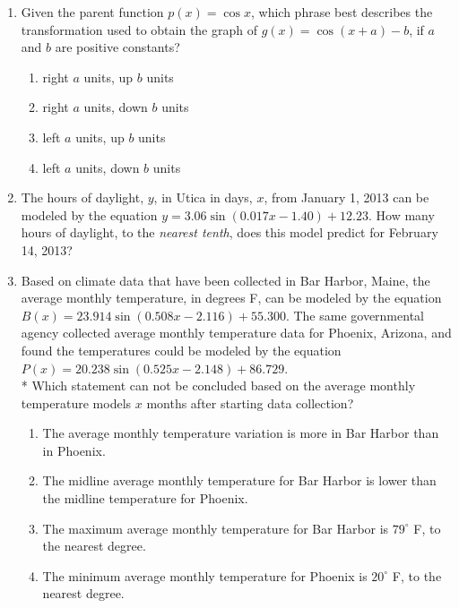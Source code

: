 \documentclass[12pt, oneside]{article}
\begin{document}
\begin{enumerate}
\item Given the parent function $p(x)=\cos x$, which phrase best describes the transformation used to obtain the graph of $g(x)=  \cos (x+a) - b$, if $a$ and $b$ are positive constants?
\begin{enumerate}
    \item right $a$ units, up $b$ units
    \item right $a$ units, down $b$ units
    \item left $a$ units, up $b$ units
    \item left $a$ units, down $b$ units
\end{enumerate}%

\item The hours of daylight, $y$, in Utica in days, $x$, from January 1, 2013 can be modeled by the equation $y = 3.06 \sin(0.017x-1.40) +12.23$. How many hours of daylight, to the \emph{nearest tenth}, does this model predict for February 14, 2013?

\item Based on climate data that have been collected in Bar Harbor, Maine, the average monthly temperature, in degrees F, can be modeled by the equation $B(x)=23.914 \sin(0.508x-2.116)+55.300$. The same governmental agency collected average monthly temperature data for Phoenix, Arizona, and found the temperatures could be modeled by the equation $P(x)=20.238 \sin(0.525x-2.148)+86.729$.\\*
Which statement can not be concluded based on the average monthly temperature models $x$ months after starting data collection?
\begin{enumerate}
    \item The average monthly temperature variation is more in Bar Harbor than in Phoenix.
    \item The midline average monthly temperature for Bar Harbor is lower than the midline temperature for Phoenix.
    \item The maximum average monthly temperature for Bar Harbor is $79^{\circ}$ F, to the nearest degree.
    \item The minimum average monthly temperature for Phoenix is $20^{\circ}$ F, to the nearest degree.
\end{enumerate} %


\end{enumerate}
\end{document}
